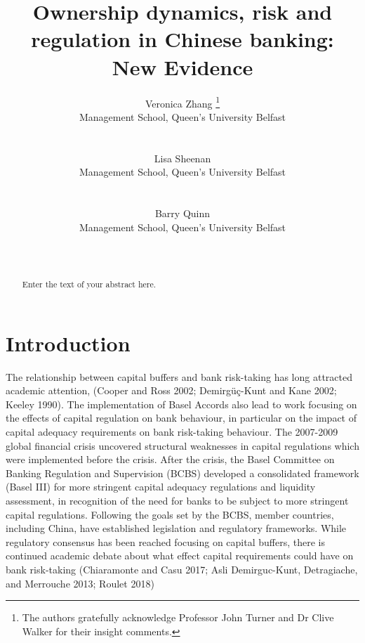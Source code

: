 \documentclass{article}
\title{Ownership dynamics, risk and regulation in Chinese banking: New
Evidence}
\author{
    Veronica Zhang
    \thanks{The authors gratefully acknowledge Professor John Turner and
Dr Clive Walker for their insight comments.}
   \\
    Management School, Queen's University Belfast \\
   \\
  \texttt{} \\
   \And
    Lisa Sheenan
   \\
    Management School, Queen's University Belfast \\
   \\
  \texttt{} \\
   \And
    Barry Quinn
   \\
    Management School, Queen's University Belfast \\
   \\
  \texttt{} \\
  }
\begin{document}
\maketitle

\def\tightlist{}


\begin{abstract}
Enter the text of your abstract here.
\end{abstract}


\hypertarget{introduction}{%
\section{Introduction}\label{introduction}}

\label{sec:intro}

The relationship between capital buffers and bank risk-taking has long
attracted academic attention, (Cooper and Ross 2002; Demirgüç-Kunt and
Kane 2002; Keeley 1990). The implementation of Basel Accords also lead
to work focusing on the effects of capital regulation on bank behaviour,
in particular on the impact of capital adequacy requirements on bank
risk-taking behaviour. The 2007-2009 global financial crisis uncovered
structural weaknesses in capital regulations which were implemented
before the crisis. After the crisis, the Basel Committee on Banking
Regulation and Supervision (BCBS) developed a consolidated framework
(Basel III) for more stringent capital adequacy regulations and
liquidity assessment, in recognition of the need for banks to be subject
to more stringent capital regulations. Following the goals set by the
BCBS, member countries, including China, have established legislation
and regulatory frameworks. While regulatory consensus has been reached
focusing on capital buffers, there is continued academic debate about
what effect capital requirements could have on bank risk-taking
(Chiaramonte and Casu 2017; Asli Demirguc-Kunt, Detragiache, and
Merrouche 2013; Roulet 2018)
\end{document}
